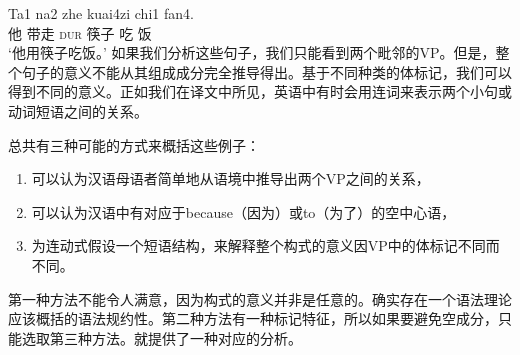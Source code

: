 \begin{exe}
\begin{xlist}[iv.]
\begin{exe}
\begin{xlist}[iv.]
\ex
\gll Ta1 na2 zhe kuai4zi chi1 fan4.\\
     他  带走 \textsc{dur} 筷子 吃 饭 \\
\glt `他用筷子吃饭。'
\zl
如果我们分析这些句子，我们只能看到两个毗邻的VP。但是，整个句子的意义不能从其组成成分完全推导得出。基于不同种类的体标记，我们可以得到不同的意义。正如我们在译文中所见，英语中有时会用连词来表示两个小句或动词短语之间的关系。

总共有三种可能的方式来概括这些例子：
\begin{enumerate}
\item 可以认为汉语母语者简单地从语境中推导出两个VP之间的关系，
\item 可以认为汉语中有对应于because（因为）或to（为了）的空中心语，
\item 为连动式假设一个短语结构，来解释整个构式的意义因VP中的体标记不同而不同。
\end{enumerate}
第一种方法不能令人满意，因为构式的意义并非是任意的。确实存在一个语法理论应该概括的语法规约性。第二种方法有一种标记特征，所以如果要避免空成分，只能选取第三种方法。\citet{ML2009a}就提供了一种对应的分析。


\end{xlist}
\end{exe}
\end{xlist}
\end{exe}
